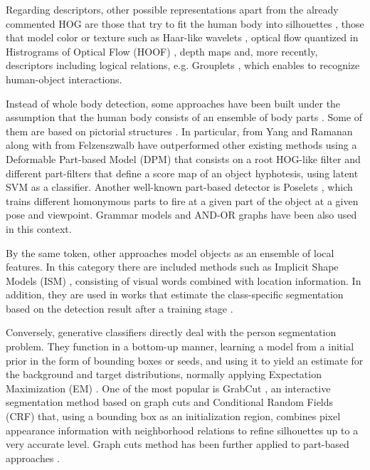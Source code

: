 \documentclass[10pt,twocolumn,letterpaper]{article}
\begin{document}
Regarding descriptors, other possible representations apart from the already commented HOG are those that try to fit the human body into silhouettes \cite{mittal2003human}, those that model color or texture such as Haar-like wavelets \cite{viola2005detecting}, optical flow quantized in Histrograms of Optical Flow (HOOF) \cite{dalal2006human}, depth maps \cite{plagemann2010real} and, more recently, descriptors including logical relations, e.g. Grouplets \cite{yao2010grouplet}, which enables to recognize human-object interactions.

Instead of whole body detection, some approaches have been built under the assumption that the human body consists of an ensemble of body parts \cite{ramanan2006learning, pirsiavash2012steerable}. Some of them are based on pictorial structures \cite{andriluka2009pictorial, yang2011articulated}. In particular, \cite{yang2011articulated, yang2012articulated} from Yang and Ramanan along with \cite{felzenszwalb2010object} from Felzenszwalb have outperformed other existing methods using a Deformable Part-based Model (DPM) that consists on a root HOG-like filter and different part-filters that define a score map of an object hyphotesis, using latent SVM as a classifier. Another well-known part-based detector is Poselets \cite{bourdev2009poselets, wang2011learning}, which trains different homonymous parts to fire at a given part of the object at a given pose and viewpoint. Grammar models \cite{girshick2011object} and AND-OR graphs \cite{zhu2008max} have been also used in this context.

By the same token, other approaches model objects as an ensemble of local features. In this category there are included methods such as Implicit Shape Models (ISM) \cite{leibe2004combined}, consisting of visual words combined with location information. In addition, they are used in works that estimate the class-specific segmentation based on the detection result after a training stage \cite{leibe2008robust}.  

Conversely, generative classifiers directly deal with the person segmentation problem. They function in a bottom-up manner, learning a model from a initial prior in the form of bounding boxes or seeds, and using it to yield an estimate for the background and target distributions, normally applying Expectation Maximization (EM) \cite{shi2000normalized, carson2002blobworld}. One of the most popular is GrabCut \cite{rother2004grabcut}, an interactive segmentation method based on graph cuts \cite{boykov2001interactive} and Conditional Random Fields (CRF) that, using a bounding box as an initialization region, combines pixel appearance information with neighborhood relations to refine silhouettes up to a very accurate level. Graph cuts method has been further applied to part-based approaches \cite{hernandez2012graph}.
 
\end{document}
